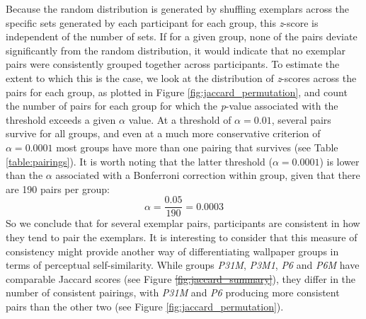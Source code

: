 \documentclass[11pt, twoside]{article}
\providecommand{\DIFaddtex}[1]{{\protect\color{blue}\uwave{#1}}} %
\providecommand{\DIFdeltex}[1]{{\protect\color{red}\sout{#1}}}                      %
\providecommand{\DIFaddbegin}{} %
\providecommand{\DIFaddend}{} %
\providecommand{\DIFdelbegin}{} %
\providecommand{\DIFdelend}{} %
\providecommand{\DIFadd}[1]{\texorpdfstring{\DIFaddtex{#1}}{#1}} %
\providecommand{\DIFdel}[1]{\texorpdfstring{\DIFdeltex{#1}}{}} %
\newcommand{\DIFscaledelfig}{0.5}
\newlength{\DIFdelgraphicswidth} %
\newlength{\DIFdelgraphicsheight} %
\newcommand{\DIFaddincludegraphics}[2][]{{\color{blue}\fbox{\DIFOincludegraphics[#1]{#2}}}} %
\newcommand{\DIFdelincludegraphics}[2][]{%
\sbox{\DIFdelgraphicsbox}{\DIFOincludegraphics[#1]{#2}}%
\settoboxwidth{\DIFdelgraphicswidth}{\DIFdelgraphicsbox} %
\settoboxtotalheight{\DIFdelgraphicsheight}{\DIFdelgraphicsbox} %
\scalebox{\DIFscaledelfig}{%
\parbox[b]{\DIFdelgraphicswidth}{\usebox{\DIFdelgraphicsbox}\\[-\baselineskip] \rule{\DIFdelgraphicswidth}{0em}}\llap{\resizebox{\DIFdelgraphicswidth}{\DIFdelgraphicsheight}{%
\setlength{\unitlength}{\DIFdelgraphicswidth}%
\begin{picture}(1,1)%
\thicklines\linethickness{2pt} %
{\color[rgb]{1,0,0}\put(0,0){\framebox(1,1){}}}%
{\color[rgb]{1,0,0}\put(0,0){\line( 1,1){1}}}%
{\color[rgb]{1,0,0}\put(0,1){\line(1,-1){1}}}%
\end{picture}%
}\hspace*{3pt}}} %
} %
\DeclareRobustCommand{\DIFaddbegin}{\DIFOaddbegin \let\includegraphics\DIFaddincludegraphics} %
\DeclareRobustCommand{\DIFaddend}{\DIFOaddend \let\includegraphics\DIFOincludegraphics} %
\DeclareRobustCommand{\DIFdelbegin}{\DIFOdelbegin \let\includegraphics\DIFdelincludegraphics} %
\DeclareRobustCommand{\DIFdelend}{\DIFOaddend \let\includegraphics\DIFOincludegraphics} %
\begin{document}
Because the random distribution is generated by shuffling exemplars across the specific sets generated by each participant for each group, this \textit{z}-score is independent of the number of sets. If for a given group, none of the pairs deviate significantly from the random distribution, it would indicate that no exemplar pairs were consistently grouped together across participants. To estimate the extent to which this is the case, we look at the distribution of \textit{z}-scores across the pairs for each group, as plotted in Figure \ref{fig:jaccard_permutation}, and count the number of pairs for each group for which the \textit{p}-value associated with the threshold exceeds a given $\alpha$ value. At a threshold of $\alpha = 0.01$, several pairs survive for all groups, and even at a much more conservative criterion of $\alpha = 0.0001$ most groups have more than one pairing that survives (see Table \ref{table:pairings}). It is worth noting that the latter threshold ($\alpha = 0.0001$) is lower than the $\alpha$ associated with a Bonferroni correction within group, given that there are 190 pairs per group: \[ \alpha = \frac{0.05}{190} = 0.0003 \] So we conclude that for several exemplar pairs, participants are consistent in how they tend to pair the exemplars. It is interesting to consider that this measure of consistency might provide another way of differentiating wallpaper groups in terms of perceptual self-similarity. While groups \textit{P31M}, \textit{P3M1}, \textit{P6} and \textit{P6M} have comparable Jaccard scores (see Figure \DIFdelbegin \DIFdel{\ref{fig:jaccard_summary}}\DIFdelend \DIFaddbegin \DIFadd{\ref{fig:n_sets_jaccard_summary}}\DIFaddend ), they differ in the number of consistent pairings, with \textit{P31M} and \textit{P6} producing more consistent pairs than the other two (see Figure \ref{fig:jaccard_permutation}). 
\end{document}

